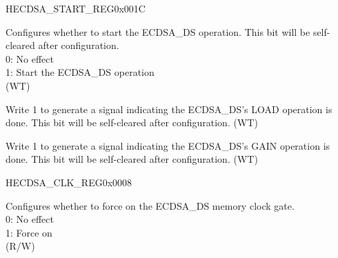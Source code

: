 \begin{register}{H}{ECDSA\_START\_REG}{0x001C}\label{regdesc:ECDSASTARTREG}
%
%
%
%
\regnewline%
\begin{regdesc}\begin{reglist}
\label{fielddesc:ECDSASTART}\item [ECDSA\_START] Configures whether to start the ECDSA\_DS operation. This bit will be self-cleared after configuration. \\
0: No effect\\
1: Start the ECDSA\_DS operation\\
(WT)
\label{fielddesc:ECDSALOADDONE}\item [ECDSA\_LOAD\_DONE] Write 1 to generate a signal indicating the ECDSA\_DS's LOAD operation is done. This bit will be self-cleared after configuration. (WT)
\label{fielddesc:ECDSAGETDONE}\item [ECDSA\_GET\_DONE] Write 1 to generate a signal indicating the ECDSA\_DS's GAIN operation is done. This bit will be self-cleared after configuration. (WT)
\end{reglist}\end{regdesc}
\end{register}


\begin{register}{H}{ECDSA\_CLK\_REG}{0x0008}\label{regdesc:ECDSACLKREG}
%
%
\regnewline%
\begin{regdesc}\begin{reglist}
\label{fielddesc:ECDSACLKGATEFORCEON}\item [ECDSA\_CLK\_GATE\_FORCE\_ON] Configures whether to force on the ECDSA\_DS memory clock gate. \\
0: No effect\\
1: Force on\\
(R/W)
\end{reglist}\end{regdesc}
\end{register}


